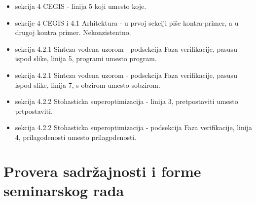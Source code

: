 \documentclass[a4paper]{report}
\begin{document}
\begin{itemize}
    \item sekcija 4 CEGIS - linija 5 koji umesto koje.\\
    \item sekcije 4 CEGIS i 4.1 Arhitektura - u prvoj sekciji piše kontra-primer, a u drugoj kontra primer. Nekonzistentno.\\
    \item sekcija 4.2.1 Sinteza vodena uzorom - podsekcija Faza verifikacije, pasusu ispod slike, linija 5, programi umesto program.\\
    \item sekcija 4.2.1 Sinteza vodena uzorom - podsekcija Faza verifikacije, pasusu ispod slike, linija 7, s obzirom umesto sobzirom.\\
    \item sekcija 4.2.2 Stohasticka superoptimizacija - linija 3, pretpostaviti umesto prtpostaviti.\\
    \item sekcija 4.2.2 Stohasticka superoptimizacija - podsekcija Faza verifikacije, linija 4, prilagodenosti umesto prilagpdenosti.\\
\end{itemize}

\section{Provera sadržajnosti i forme seminarskog rada}
\end{document}
